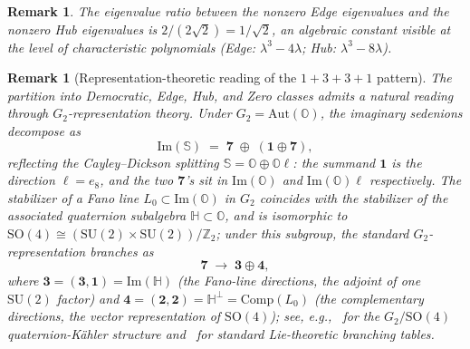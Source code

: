 \documentclass[12pt,a4paper]{article}
\newtheorem{remark}[theorem]{Remark}
\begin{document}
\begin{remark}
The eigenvalue ratio between the nonzero Edge eigenvalues and the nonzero Hub eigenvalues is $2/(2\sqrt2)=1/\sqrt2$, an algebraic constant visible at the level of characteristic polynomials (Edge: $\lambda^3-4\lambda$; Hub: $\lambda^3-8\lambda$).
\end{remark}

\begin{remark}[Representation-theoretic reading of the $1+3+3+1$ pattern]
\label{rem:rep-theory}
The partition into Democratic, Edge, Hub, and Zero classes admits a natural reading through $G_2$-representation theory. Under $G_2 = \mathrm{Aut}(\mathbb{O})$, the imaginary sedenions decompose as
\[
  \mathrm{Im}(\mathbb{S}) \;=\; \mathbf{7} \;\oplus\; (\mathbf{1} \oplus \mathbf{7}),
\]
reflecting the Cayley--Dickson splitting $\mathbb{S} = \mathbb{O} \oplus \mathbb{O}\ell$: the summand $\mathbf{1}$ is the direction $\ell = e_8$, and the two $\mathbf{7}$'s sit in $\mathrm{Im}(\mathbb{O})$ and $\mathrm{Im}(\mathbb{O})\ell$ respectively. The stabilizer of a Fano line $L_0 \subset \mathrm{Im}(\mathbb{O})$ in $G_2$ coincides with the stabilizer of the associated quaternion subalgebra $\mathbb{H} \subset \mathbb{O}$, and is isomorphic to $\mathrm{SO}(4) \cong (\mathrm{SU}(2) \times \mathrm{SU}(2))/\mathbb{Z}_2$; under this subgroup, the standard $G_2$-representation branches as
\[
  \mathbf{7} \;\longrightarrow\; \mathbf{3} \oplus \mathbf{4},
\]
where $\mathbf{3} = (\mathbf{3}, \mathbf{1}) = \mathrm{Im}(\mathbb{H})$ (the Fano-line directions, the adjoint of one $\mathrm{SU}(2)$ factor) and $\mathbf{4} = (\mathbf{2}, \mathbf{2}) = \mathbb{H}^\perp = \mathrm{Comp}(L_0)$ (the complementary directions, the vector representation of $\mathrm{SO}(4)$); see, e.g.,~\cite{reggiani2024} for the $G_2/\mathrm{SO}(4)$ quaternion-K\"ahler structure and~\cite{slansky1981} for standard Lie-theoretic branching tables.


\end{remark}
\end{document}
